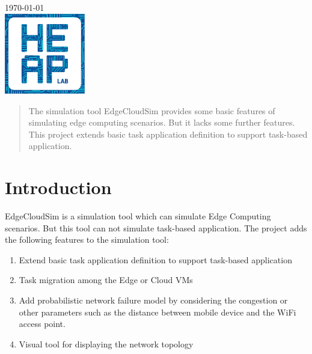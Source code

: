 \begin{titlepage}

{\large \today}\\[2cm] %


\includegraphics[width=100pt]{heaplogo.pdf}\\[1cm] %
 

\vfill %

\end{titlepage}




\begin{abstract}
The simulation tool EdgeCloudSim provides some basic features of simulating edge computing scenarios. But it lacks some further features. This project extends basic task application definition to support task-based application.
\end{abstract}

\section{Introduction}

EdgeCloudSim is a simulation tool which can simulate Edge Computing scenarios. But this tool can not simulate task-based application. The project adds the following features to the simulation tool:

\begin{enumerate}
	\item Extend basic task application definition to support task-based application
	\item Task migration among the Edge or Cloud VMs
	\item Add probabilistic network failure model by considering the congestion or other parameters such as the distance between mobile device and the WiFi access point.
	\item Visual tool for displaying the network topology
\end{enumerate}


